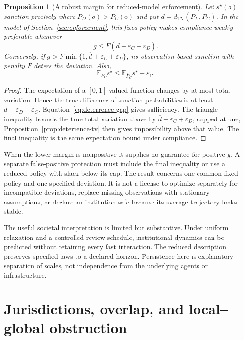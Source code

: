 \documentclass[11pt,letterpaper]{article}
\theoremstyle{plain}
\newtheorem{proposition}{Proposition}[section]
\theoremstyle{definition}
\theoremstyle{remark}
\newcommand{\TV}{d_{\mathrm{TV}}}
\newcommand{\E}{\mathbb E}
\begin{document}
\begin{proposition}[A robust margin for reduced-model enforcement]\label{prop:robust-deterrence}
Let $s^\star(o)$ sanction precisely where $\overline P_D(o)>\overline P_C(o)$ and put $\overline d=\TV(\overline P_D,\overline P_C)$. In the model of Section~\ref{sec:enforcement}, this fixed policy makes compliance weakly preferable whenever
\[
g\leq F(\overline d-\varepsilon_C-\varepsilon_D).
\]
Conversely, if $g>F\min\{1,\overline d+\varepsilon_C+\varepsilon_D\}$, no observation-based sanction with penalty $F$ deters the deviation. Also,
\[
\E_{P_C}s^\star\leq\E_{\overline P_C}s^\star+\varepsilon_C.
\]
\end{proposition}
\begin{proof}
The expectation of a $[0,1]$-valued function changes by at most total variation. Hence the true difference of sanction probabilities is at least $\overline d-\varepsilon_D-\varepsilon_C$. Equation~\eqref{eq:deterrence-gap} gives sufficiency. The triangle inequality bounds the true total variation above by $\overline d+\varepsilon_C+\varepsilon_D$, capped at one; Proposition~\ref{prop:deterrence-tv} then gives impossibility above that value. The final inequality is the same expectation bound under compliance.
\end{proof}

When the lower margin is nonpositive it supplies no guarantee for positive $g$. A separate false-positive protection must include the final inequality or use a reduced policy with slack below its cap. The result concerns one common fixed policy and one specified deviation. It is not a license to optimize separately for incompatible deviations, replace missing observations with stationary assumptions, or declare an institution safe because its average trajectory looks stable.

The useful societal interpretation is limited but substantive. Under uniform relaxation and a controlled review schedule, institutional dynamics can be predicted without retaining every fast interaction. The reduced description preserves specified laws to a declared horizon. Persistence here is explanatory separation of scales, not independence from the underlying agents or infrastructure.


\section{Jurisdictions, overlap, and local--global obstruction}\label{sec:jurisdictions}
\end{document}
